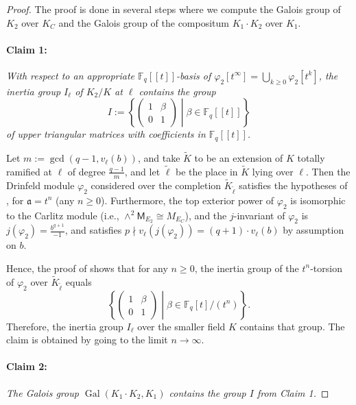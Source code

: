 \documentclass[10pt,a4paper]{amsart}
\theoremstyle{plain} %
\theoremstyle{definition}
\theoremstyle{remark}
\newcommand{\FF}{\mathbb{F}}
\newcommand{\Fq}{\FF_{\!q}}  %
\newcommand{\Gal}{\operatorname{Gal}}
\newcommand{\ps}[1]{[\![#1]\!]}  %
\newcommand{\mot}{\mathsf{M}}  %
\numberwithin{equation}{subsection}
\begin{document}
\begin{proof}
The proof is done in several steps where we compute the Galois group of $K_2$ over $K_C$ and  the Galois group of the compositum $K_1\cdot K_2$ over $K_1$.\\


\paragraph{Claim 1:} \emph{With respect to an appropriate $\Fq\ps{t}$-basis of $\varphi_2[t^\infty]=\bigcup_{k\geq 0}\varphi_2[t^k]$, the inertia group $I_\ell$ of $K_2/K$ at $\ell$ contains 
the group
\[  I:= \left\{ \begin{pmatrix} 1 & \beta \\ 0 & 1 \end{pmatrix} \middle| \beta\in \Fq\ps{t} \right\} \]
of upper triangular matrices with coefficients in $\Fq\ps{t}$.}

\medskip

Let $m:=\operatorname{gcd}(q-1,v_\ell(b))$, and take $\tilde{K}$ to be an extension of $K$ totally ramified at $\ell$ of degree $\frac{q-1}{m}$, and let $\tilde{\ell}$ be the place in $\tilde{K}$ lying over $\ell$. 
Then the Drinfeld module $\varphi_2$ considered over the completion $\tilde{K}_{\tilde{\ell}}$ satisfies the hypotheses of \cite[Prop.~4.1]{dz:dmmgatp}, for $\mathfrak{a}=t^n$ (any $n\geq 0$).
Furthermore, the top exterior power of  $\varphi_2$ is isomorphic to the Carlitz module (i.e., $\wedge^{2} \mot_{E_2} \cong M_{E_C}$), 
and the $j$-invariant of $\varphi_2$ is $j(\varphi_2)=\frac{b^{q+1}}{-1}$, and satisfies $p \nmid v_\ell(j(\varphi_2))=(q+1)\cdot v_\ell(b)$ by assumption on $b$.

Hence, the proof of \cite[Prop.4.4]{dz:dmmgatp} shows that for any $n\geq 0$, the inertia group of the $t^n$-torsion of $\varphi_2$ over $\tilde{K}_{\tilde{\ell}}$ equals
\[   \left\{ \begin{pmatrix} 1 & \beta \\ 0 & 1 \end{pmatrix} \middle| \beta\in \Fq[t]/(t^n) \right\}. \] 
Therefore, the inertia group $I_\ell$ over the smaller field $K$ contains that group. The claim is obtained by going to the limit $n\to \infty$.\\


\paragraph{Claim 2:} \emph{The Galois group $\Gal(K_1\cdot K_2, K_1)$ contains the group $I$ from Claim 1.}


\end{proof}
\end{document}
